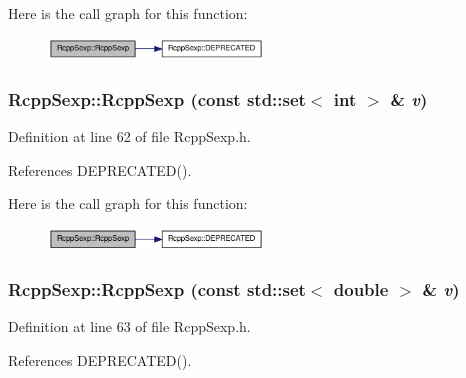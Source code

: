Here is the call graph for this function:\nopagebreak
\begin{figure}[H]
\begin{center}
\leavevmode
\includegraphics[width=162pt]{classRcppSexp_ad953b65f5ea98d7519b51f1f56c8847a_cgraph}
\end{center}
\end{figure}
\hypertarget{classRcppSexp_ab11056882afe3cf2c904003b63f6ac99}{
\subsubsection[{RcppSexp}]{\setlength{\rightskip}{0pt plus 5cm}RcppSexp::RcppSexp (const std::set$<$ int $>$ \& {\em v})}}
\label{classRcppSexp_ab11056882afe3cf2c904003b63f6ac99}


Definition at line 62 of file RcppSexp.h.

References DEPRECATED().

Here is the call graph for this function:\nopagebreak
\begin{figure}[H]
\begin{center}
\leavevmode
\includegraphics[width=162pt]{classRcppSexp_ab11056882afe3cf2c904003b63f6ac99_cgraph}
\end{center}
\end{figure}
\hypertarget{classRcppSexp_ab7e14928df338b3d0280685bf89c0af4}{
\subsubsection[{RcppSexp}]{\setlength{\rightskip}{0pt plus 5cm}RcppSexp::RcppSexp (const std::set$<$ double $>$ \& {\em v})}}
\label{classRcppSexp_ab7e14928df338b3d0280685bf89c0af4}


Definition at line 63 of file RcppSexp.h.

References DEPRECATED().

